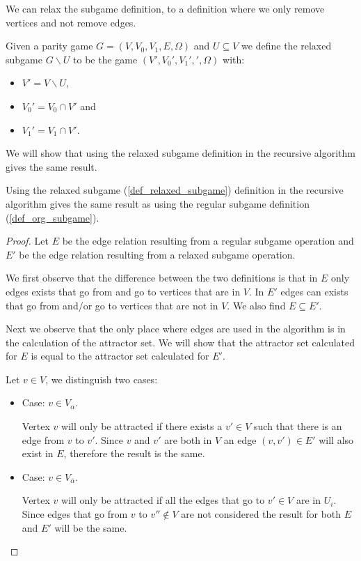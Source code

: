 We can relax the subgame definition, to a definition where we only remove vertices and not remove edges.
\begin{definition}
	\label{def_relaxed_subgame}
	Given a parity game $G = (V,V_0,V_1, E,\Omega)$ and $U \subseteq V$ we define the relaxed subgame $G \backslash U$ to be the game $(V', V_0', V_1', ', \Omega)$ with:
	\begin{itemize}
		\item $V' = V \backslash U$,
		\item $V_0' = V_0 \cap V'$ and
		\item $V_1' = V_1 \cap V'$.
	\end{itemize}
\end{definition}
We will show that using the relaxed subgame definition in the recursive algorithm gives the same result.
\begin{lemma}
	Using the relaxed subgame (\ref{def_relaxed_subgame}) definition in the recursive algorithm gives the same result as using the regular subgame definition (\ref{def_org_subgame}).
	\begin{proof}
		Let $E$ be the edge relation resulting from a regular subgame operation and $E'$ be the edge relation resulting from a relaxed subgame operation.
		
		We first observe that the difference between the two definitions is that in $E$ only edges exists that go from and go to vertices that are in $V$. In $E'$ edges can exists that go from and/or go to vertices that are not in $V$. We also find $E \subseteq E'$.
		
		Next we observe that the only place where edges are used in the algorithm is in the calculation of the attractor set. We will show that the attractor set calculated for $E$ is equal to the attractor set calculated for $E'$.
		
		Let $v \in V$, we distinguish two cases:
		\begin{itemize}
			\item Case: $v \in V_\alpha$.
			
			Vertex $v$ will only be attracted if there exists a $v' \in V$ such that there is an edge from $v$ to $v'$. Since $v$ and $v'$ are both in $V$ an edge $(v,v') \in E'$ will also exist in $E$, therefore the result is the same.
			\item Case: $v \in V_{\overline{\alpha}}$.
			
		    Vertex $v$ will only be attracted if all the edges that go to $v' \in V$ are in $U_i$. Since edges that go from $v$ to $v'' \notin V$ are not considered the result for both $E$ and $E'$ will be the same.
		\end{itemize}
	\end{proof}
\end{lemma}
